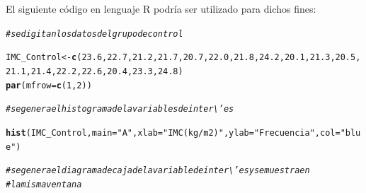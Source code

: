 \documentclass[12pt,letterpaper]{article}\usepackage[]{graphicx}\usepackage[]{color}
\makeatletter
\newcommand{\hlnum}[1]{\textcolor[rgb]{0.686,0.059,0.569}{#1}}%
\newcommand{\hlstr}[1]{\textcolor[rgb]{0.192,0.494,0.8}{#1}}%
\newcommand{\hlcom}[1]{\textcolor[rgb]{0.678,0.584,0.686}{\textit{#1}}}%
\newcommand{\hlstd}[1]{\textcolor[rgb]{0.345,0.345,0.345}{#1}}%
\newcommand{\hlkwb}[1]{\textcolor[rgb]{0.69,0.353,0.396}{#1}}%
\newcommand{\hlkwc}[1]{\textcolor[rgb]{0.333,0.667,0.333}{#1}}%
\newcommand{\hlkwd}[1]{\textcolor[rgb]{0.737,0.353,0.396}{\textbf{#1}}}%
\newenvironment{kframe}{%
 \def\at@end@of@kframe{}%
 \ifinner\ifhmode%
  \def\at@end@of@kframe{\end{minipage}}%
  \begin{minipage}{\columnwidth}%
 \fi\fi%
 \def\FrameCommand##1{\hskip\@totalleftmargin \hskip-\fboxsep
 \colorbox{shadecolor}{##1}\hskip-\fboxsep
     \hskip-\linewidth \hskip-\@totalleftmargin \hskip\columnwidth}%
 \MakeFramed {\advance\hsize-\width
   \@totalleftmargin\z@ \linewidth\hsize
   \@setminipage}}%
 {\par\unskip\endMakeFramed%
 \at@end@of@kframe}
\newenvironment{knitrout}{}{} %
\makeatother
\begin{document}
El siguiente c\'odigo en lenguaje R podr\'ia ser utilizado para dichos fines:
\begin{knitrout}
\color{fgcolor}\begin{kframe}
\begin{alltt}
\hlcom{#se digitan los datos del grupo de control}

\hlstd{IMC_Control}\hlkwb{<-}\hlkwd{c}\hlstd{(}\hlnum{23.6}\hlstd{,} \hlnum{22.7}\hlstd{,} \hlnum{21.2}\hlstd{,} \hlnum{21.7}\hlstd{,} \hlnum{20.7}\hlstd{,} \hlnum{22.0}\hlstd{,} \hlnum{21.8}\hlstd{,} \hlnum{24.2}\hlstd{,} \hlnum{20.1}\hlstd{,} \hlnum{21.3}\hlstd{,} \hlnum{20.5}\hlstd{,}
                 \hlnum{21.1}\hlstd{,} \hlnum{21.4}\hlstd{,} \hlnum{22.2}\hlstd{,} \hlnum{22.6}\hlstd{,} \hlnum{20.4}\hlstd{,} \hlnum{23.3}\hlstd{,} \hlnum{24.8}\hlstd{)}
\hlkwd{par}\hlstd{(}\hlkwc{mfrow}\hlstd{=}\hlkwd{c}\hlstd{(}\hlnum{1}\hlstd{,}\hlnum{2}\hlstd{))}

\hlcom{#se genera el histograma de la variables de inter\textbackslash{}'es }

\hlkwd{hist}\hlstd{(IMC_Control,}\hlkwc{main}\hlstd{=}\hlstr{"A"}\hlstd{,}\hlkwc{xlab}\hlstd{=}\hlstr{"IMC (kg/m2)"}\hlstd{,}\hlkwc{ylab}\hlstd{=}\hlstr{"Frecuencia"}\hlstd{,}\hlkwc{col}\hlstd{=}\hlstr{"blue"}\hlstd{)}

\hlcom{# se genera el diagrama de caja de la variable de inter\textbackslash{}'es y se muestra en }
\hlcom{# la misma ventana }


\end{alltt}
\end{kframe}
\end{knitrout}
\end{document}
